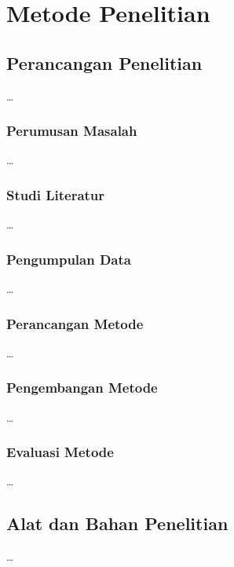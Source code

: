 \chapter{Metode Penelitian}

\section{Perancangan Penelitian}

\dots

\subsection{Perumusan Masalah}

\dots

\subsection{Studi Literatur}

\dots

\subsection{Pengumpulan Data}

\dots

\subsection{Perancangan Metode}

\dots

\subsection{Pengembangan Metode}

\dots

\subsection{Evaluasi Metode}

\dots

\section{Alat dan Bahan Penelitian}

\dots
